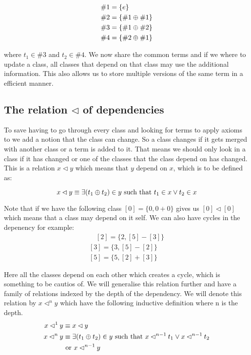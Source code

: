 \begin{equation*}
\begin{aligned}
\#1 & = \{e\} \\
\#2 &= \{\#1 \oplus \#1\} \\
\#3 &= \{ \#1 \oplus \#2\} \\
\#4 &= \{ \#2 \oplus \#1\}
\end{aligned}
\end{equation*}

where $t_1 \in \#3$ and $t_2 \in \#4$. We now share the common terms and if we 
where to update a class, all classes that depend on that class may use the additional information. %
This also allows us to store multiple versions of the same term in a efficient 
manner.

\subsection{The relation $\lhd$ of dependencies}
To save having to go through every class and looking for terms to apply axioms to
we add a notion that the class can change. So a class changes if it gets merged
with another class or a term is added to it. That means we should only look in a
class if it has changed or one of the classes that the class depend on has changed.
This is a relation $x \lhd y$ which means that $y$ depend
on $x$, which is to be defined as:  

\begin{equation*}
x \lhd y \equiv \exists (t_1 \oplus t_2) \in y \text{ such that } t_1 \in x
\vee t_2 \in x
\end{equation*}

Note that if we have the following class $[0] = \{0, 0 + 0\}$ gives us $[0] \lhd [0]$
which means that a class may depend on it self. We can also have cycles in the depenency
for example:
\begin{equation*}
\begin{aligned}
\quad [2] = \{ 2 , [5] - [3] \} \\ %
[3] = \{ 3 , [5] - [2] \} \\
[5] = \{ 5 , [2] + [3] \}
\end{aligned}
\end{equation*}

Here all the classes depend on each other which creates a cycle, which is something
to be cautios of. We will generalise this relation
further and have a family of relations indexed by the depth of the dependency.
We will denote this relation by $x \lhd^n y$ which have the following inductive
definition where n is the depth.
\begin{equation*}
\begin{aligned}
x \lhd^1 y &\equiv x \lhd y \\
x \lhd^n y &\equiv \exists (t_1 \oplus t_2) \in y \text { such that } 
x \lhd^{n-1} t_1 \vee x \lhd^{n-1} t_2 \\
& \text{ or } x \lhd^{n-1} y
\end{aligned}
\end{equation*}

